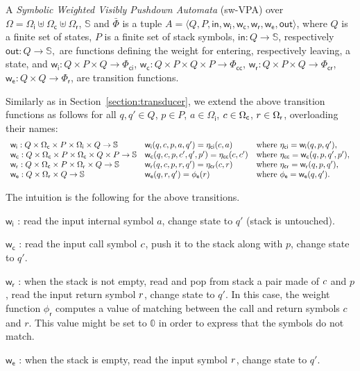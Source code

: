\documentclass[runningheads]{llncs}
\def\<#1>{\langle #1 \rangle}
\newcommand{\Semiring}{\mathbb{S}}
\newcommand{\zero}{\mathbb{0}}
\def\SWVPA{\textsf{sw-VPA}\xspace}
\def\wei{\mathsf{w}}
\def\init{\mathsf{in}}
\def\final{\mathsf{out}}
\newcommand{\call}[1]{\ensuremath #1} %
\newcommand{\return}[1]{\ensuremath #1} %
\def\Omegai{{\Omega_\mathsf{i}}}
\def\Omegac{{\Omega_\mathsf{c}}}
\def\Omegar{{\Omega_\mathsf{r}}}
\def\Phir{{\Phi_\mathsf{r}}}
\def\Phici{{\Phi_\mathsf{ci}}}
\def\Phicc{{\Phi_\mathsf{cc}}}
\def\Phicr{{\Phi_\mathsf{cr}}}
\def\weii{{\wei_\mathsf{i}}}
\def\weic{{\wei_\mathsf{c}}}
\def\weir{{\wei_\mathsf{r}}}
\def\weie{{\wei_\mathsf{e}}}
\begin{document}
\begin{definition}
A \emph{Symbolic Weighted Visibly Pushdown Automata} (\SWVPA) 
over  $\Omega = \Omegai \uplus \Omegac \uplus \Omegar$, $\Semiring$ and $\bar\Phi$ 
is a tuple $A = \< Q, P, \init, \weii, \weic, \weir, \weie, \final >$,
where $Q$ is a finite set of states, 
$P$ is a finite set of stack symbols, 
$\mathsf{in} : Q \to \Semiring$, 
respectively $\mathsf{out} : Q \to \Semiring,$
are functions defining the weight for entering, 
respectively leaving, a state, 
and 
$\weii : Q \times P \times Q \to \Phici$,  
$\weic : Q \times P \times Q \times P \to \Phicc$,  
$\weir : Q \times P \times Q \to \Phicr$,  
$\weie : Q \times Q \to \Phir$,  
are transition functions.
\end{definition}
%
Similarly as in Section~\ref{section:transducer}, 
we extend the above transition functions as follows
for all $q, q' \in Q$, $p \in P$, 
$a \in \Omegai$, 
$\call{c} \in \Omegac$, 
$\return{r} \in \Omegar$, 
overloading their names: %
\[
\begin{array}{lll}
\weii: Q \times \Omegac \times P \times \Omegai \times Q \to \Semiring & 
\weii(q, c, p, a, q') = \eta_\mathsf{ci}(c, a) & 
\mathrm{where~} \eta_\mathsf{ci} = \weii(q, p, q'),\\
%
\weic: Q \times \Omegac \times P \times  \Omegac \times Q \times P \to \Semiring & 
\weic(q, c, p, \call{c'}, q', p') = \eta_\mathsf{cc}(c, \call{c'}) & 
\mathrm{where~} \eta_\mathsf{cc} = \weic(q, p, q', p'),\\
%
\weir: Q \times \Omegac \times P \times \Omegar \times Q \to \Semiring & 
\weir(q, {\call{c}},  p, {\return{r}}, q') = \eta_\mathsf{cr}({\call{c}},  {\return{r}}) & 
\mathrm{where~} \eta_\mathsf{cr} = \weir(q, p, q'),\\
%
\weie: Q \times \Omegar \times Q \to \Semiring & 
\weie(q, {\return{r}}, q') = \phi_\mathsf{e}({\return{r}}) &
\mathrm{where~} \phi_\mathsf{e} = \weie(q, q').\\
\end{array}      
\]

\noindent
The intuition is the following for the above transitions.
\begin{description}
\item $\weii$ : read the input internal symbol $a$, change state to $q'$ (stack is untouched).
\item $\weic$ : read the input call symbol $\call{c}$, push it to the stack along with $p$, change state to $q'$.
\item $\weir$ : when the stack is not empty, 
      read and pop from stack a pair made of $\call{c}$ and $p$, 
      read the input return symbol $\return{r}$, change state to $q'$.
      In this case, the weight function $\phi_\mathsf{r}$ 
      computes a value of matching between the call and return symbols $c$ and $r$.
      This value might be set to $\zero$ in order to express that the symbols do not match.
\item $\weie$ : when the stack is empty, 
      read the input symbol $\call{r}$, change state to $q'$.
\end{description}
\end{document}

